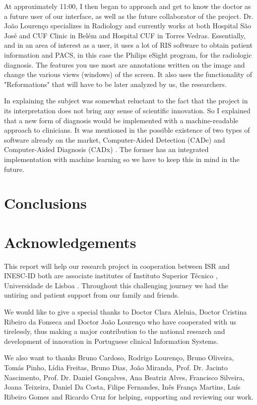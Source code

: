 At approximately 11:00, I then began to approach and get to know the doctor as a future user of our interface, as well as the future collaborator of the project. Dr. Jo\~{a}o Louren\c{c}o \cite{joaoLourenco} specializes in Radiology and currently works at both Hospital S\~{a}o Jos\'{e} and CUF Clinic in Bel\'{e}m and Hospital CUF in Torres Vedras. Essentially, and in an area of ​​interest as a user, it uses a lot of RIS software to obtain patient information and PACS, in this case the Philips eSight program, for the radiologic diagnosis. The features you use most are annotations written on the image and change the various views (windows) of the screen. It also uses the functionality of "Reformations" that will have to be later analyzed by us, the researchers.

In explaining the subject was somewhat reluctant to the fact that the project in its interpretation does not bring any sense of scientific innovation. So I explained that a new form of diagnosis would be implemented with a machine-readable approach to clinicians. It was mentioned in the possible existence of two types of software already on the market, Computer-Aided Detection (CADe) and Computer-Aided Diagnosis (CADx) \cite{computerAidedDiagnosis}. The former has an integrated implementation with machine learning so we have to keep this in mind in the future.

\clearpage

\section{Conclusions}

\clearpage

\section{Acknowledgements}

This report will help our research project in cooperation between ISR \cite{isr} and INESC-ID \cite{inescid} both are associate institutes of Instituto Superior T\'{e}cnico \cite{ist}, Universidade de Lisboa \cite{ul}. Throughout this challenging journey we had the untiring and patient support from our family and friends.

We would like to give a special thanks to Doctor Clara Aleluia, Doctor Cristina Ribeiro da Fonseca and Doctor Jo\~{a}o Louren\c{c}o who have cooperated with us tirelessly, thus making a major contribution to the national research and development of innovation in Portuguese clinical Information Systems.

We also want to thanks Bruno Cardoso, Rodrigo Louren\c{c}o, Bruno Oliveira, Tom\'{a}s Pinho, L\'{i}dia Freitas, Bruno Dias, Jo\~{a}o Miranda, Prof. Dr. Jacinto Nascimento, Prof. Dr. Daniel Gon\c{c}alves, Ana Beatriz Alves, Francisco Silveira, Joana Teixeira, Daniel Da Costa, Filipe Fernandes, In\^{e}s Fran\c{c}a Martins, Lu\'{i}s Ribeiro Gomes and Ricardo Cruz for helping, supporting and reviewing our work.

\clearpage

\printbibliography


